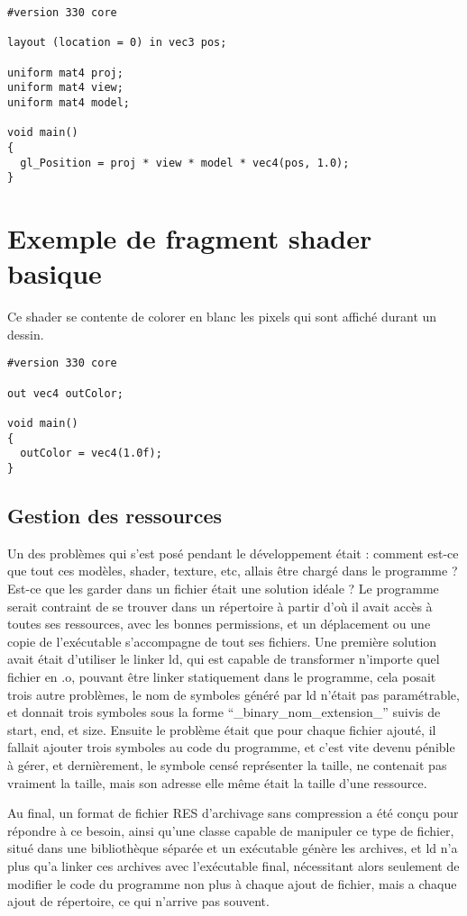 \documentclass[11pt, a4paper, titlepage]{article}
\begin{document}
\begin{lstlisting}
#version 330 core

layout (location = 0) in vec3 pos;

uniform mat4 proj;
uniform mat4 view;
uniform mat4 model;

void main()
{
  gl_Position = proj * view * model * vec4(pos, 1.0);
}
\end{lstlisting}

\section{Exemple de fragment shader basique}
Ce shader se contente de colorer en blanc les pixels qui sont affiché
durant un dessin.

\begin{lstlisting}
#version 330 core

out vec4 outColor;

void main()
{
  outColor = vec4(1.0f);
}
\end{lstlisting}

\pagebreak

\subsection{Gestion des ressources}

Un des problèmes qui s'est posé pendant le développement était :
comment est-ce que tout ces modèles, shader, texture, etc, allais être
chargé dans le programme ?  Est-ce que les garder dans un fichier
était une solution idéale ? Le programme serait contraint de se
trouver dans un répertoire à partir d'où il avait accès à toutes ses
ressources, avec les bonnes permissions, et un déplacement ou une
copie de l'exécutable s'accompagne de tout ses fichiers.  Une première
solution avait était d'utiliser le linker ld, qui est capable de
transformer n'importe quel fichier en .o, pouvant être linker
statiquement dans le programme, cela posait trois autre problèmes, le
nom de symboles généré par ld n'était pas paramétrable, et donnait
trois symboles sous la forme ``\_binary\_nom\_extension\_'' suivis de
start, end, et size. Ensuite le problème était que pour chaque fichier
ajouté, il fallait ajouter trois symboles au code du programme, et
c'est vite devenu pénible à gérer, et dernièrement, le symbole censé
représenter la taille, ne contenait pas vraiment la taille, mais son
adresse elle même était la taille d'une ressource.

Au final, un format de fichier RES d'archivage sans compression a été
conçu pour répondre à ce besoin, ainsi qu'une classe capable de
manipuler ce type de fichier, situé dans une bibliothèque séparée et
un exécutable génère les archives, et ld n'a plus qu'a linker ces
archives avec l'exécutable final, nécessitant alors seulement de
modifier le code du programme non plus à chaque ajout de fichier, mais
a chaque ajout de répertoire, ce qui n'arrive pas souvent.
\end{document}
